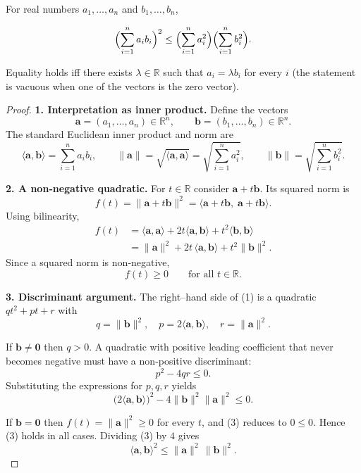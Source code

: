 \begin{theorem}
For real numbers \(a_{1},\dots ,a_{n}\) and \(b_{1},\dots ,b_{n}\),

\[
\Bigl(\sum_{i=1}^{n}a_{i}b_{i}\Bigr)^{2}\le
\Bigl(\sum_{i=1}^{n}a_{i}^{2}\Bigr)\Bigl(\sum_{i=1}^{n}b_{i}^{2}\Bigr).
\]

Equality holds iff there exists \(\lambda\in\mathbb{R}\) such that \(a_{i}= \lambda b_{i}\) for every \(i\) (the statement is vacuous when one of the vectors is the zero vector).
\end{theorem}

\begin{proof}
\textbf{1. Interpretation as inner product.}  
Define the vectors
\[
\mathbf a=(a_{1},\dots ,a_{n})\in\mathbb R^{n},
\qquad
\mathbf b=(b_{1},\dots ,b_{n})\in\mathbb R^{n}.
\]
The standard Euclidean inner product and norm are
\[
\langle\mathbf a,\mathbf b\rangle=\sum_{i=1}^{n}a_{i}b_{i},\qquad
\|\mathbf a\|=\sqrt{\langle\mathbf a,\mathbf a\rangle}
 =\sqrt{\sum_{i=1}^{n}a_{i}^{2}},\qquad
\|\mathbf b\|=\sqrt{\sum_{i=1}^{n}b_{i}^{2}}.
\]

\textbf{2. A non‑negative quadratic.}  
For \(t\in\mathbb R\) consider \(\mathbf a+t\mathbf b\). Its squared norm is
\[
f(t)=\|\mathbf a+t\mathbf b\|^{2}
    =\langle\mathbf a+t\mathbf b,\;\mathbf a+t\mathbf b\rangle .
\]
Using bilinearity,
\begin{align*}
f(t)&=\langle\mathbf a,\mathbf a\rangle
      +2t\langle\mathbf a,\mathbf b\rangle
      +t^{2}\langle\mathbf b,\mathbf b\rangle  \\
    &=\|\mathbf a\|^{2}+2t\,\langle\mathbf a,\mathbf b\rangle
      +t^{2}\|\mathbf b\|^{2}. \tag{1}
\end{align*}
Since a squared norm is non‑negative,
\[
f(t)\ge 0\qquad\text{for all }t\in\mathbb R. \tag{2}
\]

\textbf{3. Discriminant argument.}  
The right–hand side of (1) is a quadratic \(q t^{2}+p t+r\) with
\[
q=\|\mathbf b\|^{2},\quad
p=2\langle\mathbf a,\mathbf b\rangle,\quad
r=\|\mathbf a\|^{2}.
\]

If \(\mathbf b\neq\mathbf 0\) then \(q>0\). A quadratic with positive leading coefficient that never becomes negative must have a non‑positive discriminant:
\[
p^{2}-4qr\le 0.
\]
Substituting the expressions for \(p,q,r\) yields
\[
\bigl(2\langle\mathbf a,\mathbf b\rangle\bigr)^{2}
-4\|\mathbf b\|^{2}\|\mathbf a\|^{2}\le 0. \tag{3}
\]

If \(\mathbf b=\mathbf 0\) then \(f(t)=\|\mathbf a\|^{2}\ge0\) for every \(t\), and (3) reduces to \(0\le0\). Hence (3) holds in all cases. Dividing (3) by \(4\) gives
\[
\langle\mathbf a,\mathbf b\rangle^{2}\le\|\mathbf a\|^{2}\,\|\mathbf b\|^{2}. \tag{4}
\]


\end{proof}
